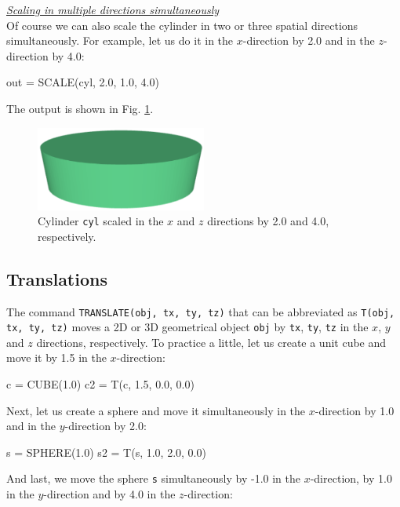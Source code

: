 \noindent
\underline{\em Scaling in multiple directions simultaneously}\\

Of course we can also scale the cylinder in two or three spatial directions 
simultaneously. For example, let us do it in the $x$-direction 
by 2.0 and in the $z$-direction by 4.0:

\begin{bluecode}
out = SCALE(cyl, 2.0, 1.0, 4.0)
\end{bluecode}
The output is shown in Fig. \ref{fig:scale-4}.


\begin{figure}[!ht]
\begin{center}
\includegraphics[width=0.5\textwidth]{img/scale-4.png}
\end{center}
\vspace{-4mm}
\caption{Cylinder {\tt cyl} scaled in the $x$ and $z$ directions by 2.0 and 4.0, respectively.}
\label{fig:scale-4}
\vspace{-1cm}
\end{figure}
\newpage

\subsection{Translations} \label{sec:translate}

The command {\tt TRANSLATE(obj, tx, ty, tz)} that can be abbreviated as 
{\tt T(obj, tx, ty, tz)} moves a 2D or 3D geometrical object {\tt obj} by {\tt tx}, {\tt ty},
{\tt tz} in the $x$, $y$ and $z$ directions, respectively. To practice
a little, let us create a unit cube and move it by 1.5 in the $x$-direction:

\begin{bluecode}
c = CUBE(1.0)
c2 = T(c, 1.5, 0.0, 0.0)
\end{bluecode}
Next, let us create a sphere and move it simultaneously 
in the $x$-direction by 1.0 and in the $y$-direction by 2.0:

\begin{bluecode}
s = SPHERE(1.0)
s2 = T(s, 1.0, 2.0, 0.0)
\end{bluecode}
And last, we move the sphere {\tt s} simultaneously by -1.0 in the $x$-direction, 
by 1.0 in the $y$-direction and by 4.0 in the $z$-direction:

